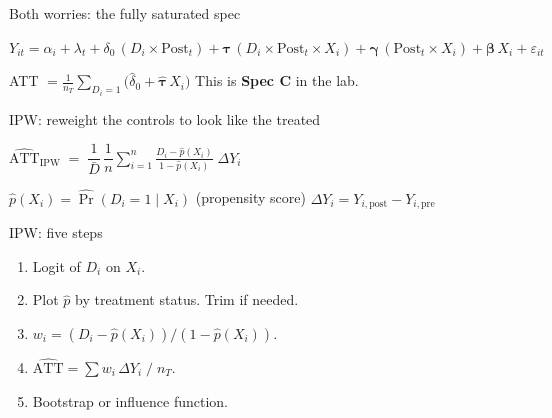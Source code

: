 \documentclass[aspectratio=169,11pt]{beamer}
\begin{document}
\begin{frame}{Both worries: the fully saturated spec}
\vspace{0.6em}
\begin{center}
\large
$Y_{it} = \alpha_i + \lambda_t
      + \delta_0\,(D_i \times \mathrm{Post}_t)
      + \boldsymbol{\tau}\,(D_i \times \mathrm{Post}_t \times X_i)
      + \boldsymbol{\gamma}\,(\mathrm{Post}_t \times X_i)
      + \boldsymbol{\beta}\,X_i
      + \varepsilon_{it}$
\end{center}
\vspace{0.8em}
\begin{center}
\color{warmgray}\small
ATT $= \frac{1}{n_T}\displaystyle\sum_{D_i=1} \bigl(\hat\delta_0 + \hat{\boldsymbol{\tau}}\,X_i\bigr)$
\quad\textperiodcentered\quad
This is \textbf{Spec C} in the lab.
\end{center}
\end{frame}


\begin{frame}{IPW: reweight the controls to look like the treated}
\vspace{1.0em}
\begin{center}
\large
$\widehat{\mathrm{ATT}}_{\mathrm{IPW}}
  \;=\; \dfrac{1}{\bar{D}}\,\dfrac{1}{n}
        \displaystyle\sum_{i=1}^{n}
        \frac{D_i - \hat{p}(X_i)}{1 - \hat{p}(X_i)}
        \;\Delta Y_i$
\end{center}
\vspace{0.8em}
\begin{center}
\color{warmgray}\small
$\hat{p}(X_i) = \widehat{\Pr}(D_i=1\mid X_i)$ \quad (propensity score)
\qquad
$\Delta Y_i = Y_{i,\mathrm{post}} - Y_{i,\mathrm{pre}}$
\end{center}
\end{frame}

\begin{frame}{IPW: five steps}
\vspace{0.8em}
\begin{enumerate}\setlength\itemsep{0.5em}
  \item {} \;Logit of $D_i$ on $X_i$.
  \item {} \;Plot $\hat{p}$ by treatment status. Trim if needed.
  \item {} \;$w_i = (D_i - \hat{p}(X_i)) / (1 - \hat{p}(X_i))$.
  \item {} \;$\widehat{\mathrm{ATT}} = \sum w_i\,\Delta Y_i \;/\; n_T$.
  \item {} \;Bootstrap or influence function.
\end{enumerate}
\end{frame}
\end{document}
